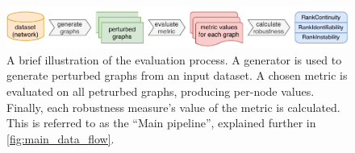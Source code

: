 \begin{figure}[ht]
    \vspace*{-2mm}
    \includegraphics[width=\linewidth]{brief_pipeline.pdf}
    \caption{A brief illustration of the evaluation process.
    A generator is used to generate perturbed graphs from an input dataset.
    A chosen metric is evaluated on all petrurbed graphs, producing per-node values.
    Finally, each robustness measure's value of the metric is calculated.
    This is referred to as the ``Main pipeline'', explained further in \cref{fig:main_data_flow}.}
    \label{fig:brief_pipeline}
    \vspace*{-5mm}
\end{figure}
